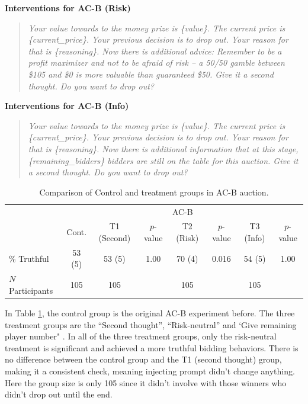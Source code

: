 \documentclass{article} %
\begin{document}
\textbf{Interventions for AC-B (Risk)}
\begin{quote}
\textit{    Your value towards to the money prize is \{value\}.
    The current price is \{current\_price\}.
    Your previous decision is to drop out. Your reason for that is \{reasoning\}.
    Now there is additional advice: Remember to be a profit maximizer and not to be afraid of risk -- a 50/50 gamble between \$105 and \$0 is more valuable than guaranteed \$50.
    Give it a second thought. Do you want to drop out?}
\end{quote}

\textbf{Interventions for AC-B (Info)}
\begin{quote}
\textit{    Your value towards to the money prize is \{value\}.
    The current price is \{current\_price\}.
    Your previous decision is to drop out. Your reason for that is \{reasoning\}.
    Now there is additional information that at this stage, \{remaining\_bidders\} bidders are still on the table for this auction.    
    Give it a second thought. Do you want to drop out?}
\end{quote}


\begin{table}[htbp]
\centering
\begin{tabular}{lccccccc}
\hline
& \multicolumn{7}{c}{AC-B} \\
\cline{2-8}
& Cont. & T1 (Second) & $p$-value & T2 (Risk) & $p$-value & T3 (Info) & $p$-value \\
\hline
\% Truthful & 53 (5) & 53 (5) & 1.00 & 70 (4) & 0.016 & 54 (5) & 1.00 \\
$N$ Participants & 105 & 105 & & 105 & & 105 & \\
\hline
\end{tabular}
\caption{Comparison of Control and treatment groups in AC-B auction.}
\label{tab:comparison_acb}
\end{table}

 In Table \ref{tab:comparison_acb}, the control group is the original AC-B experiment before. The three treatment groups are the ``Second thought'', ``Risk-neutral'' and `Give remaining player number" . In all of the three treatment groups, only the risk-neutral treatment is significant and achieved a more truthful bidding behaviors. There is no difference between the control group and the T1 (second thought) group, making it a consistent check, meaning injecting prompt didn't change anything.
Here the group size is only 105 since it didn't involve with those winners who didn't drop out until the end.
\end{document}
